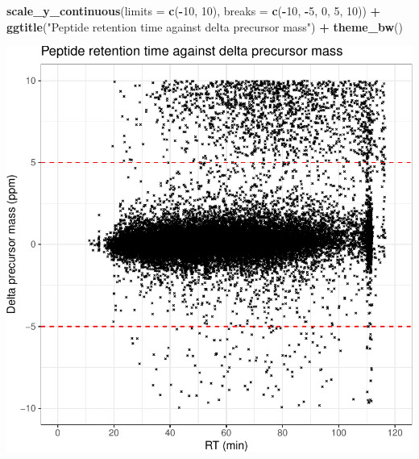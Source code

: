 \documentclass[9pt,a4paper,]{extarticle}
\newenvironment{Shaded}{\begin{snugshade}}{\end{snugshade}}
\newcommand{\AttributeTok}[1]{\textcolor[rgb]{0.13,0.29,0.53}{#1}}
\newcommand{\DecValTok}[1]{\textcolor[rgb]{0.00,0.00,0.81}{#1}}
\newcommand{\FunctionTok}[1]{\textcolor[rgb]{0.13,0.29,0.53}{\textbf{#1}}}
\newcommand{\NormalTok}[1]{#1}
\newcommand{\SpecialCharTok}[1]{\textcolor[rgb]{0.81,0.36,0.00}{\textbf{#1}}}
\newcommand{\StringTok}[1]{\textcolor[rgb]{0.31,0.60,0.02}{#1}}
\begin{document}
\begin{Shaded}
\begin{Highlighting}[]
  \FunctionTok{scale\_y\_continuous}\NormalTok{(}\AttributeTok{limits =} \FunctionTok{c}\NormalTok{(}\SpecialCharTok{{-}}\DecValTok{10}\NormalTok{, }\DecValTok{10}\NormalTok{), }\AttributeTok{breaks =} \FunctionTok{c}\NormalTok{(}\SpecialCharTok{{-}}\DecValTok{10}\NormalTok{, }\SpecialCharTok{{-}}\DecValTok{5}\NormalTok{, }\DecValTok{0}\NormalTok{, }\DecValTok{5}\NormalTok{, }\DecValTok{10}\NormalTok{)) }\SpecialCharTok{+}
  \FunctionTok{ggtitle}\NormalTok{(}\StringTok{"Peptide retention time against delta precursor mass"}\NormalTok{) }\SpecialCharTok{+}
  \FunctionTok{theme\_bw}\NormalTok{()}
\end{Highlighting}
\end{Shaded}

\begin{center}\includegraphics[height=0.3\textheight]{workflow_expressions_files/figure-latex/lfq_mass_accuracy-1} \end{center}
\end{document}
